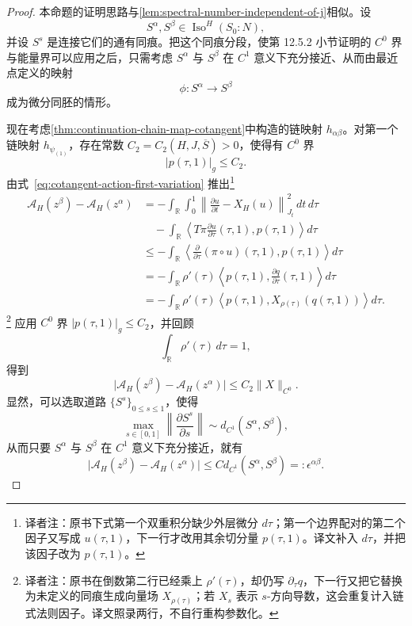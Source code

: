 \begin{proof}
本命题的证明思路与\cref{lem:spectral-number-independent-of-j}相似。设
\[
  S^\alpha,S^\beta\in\operatorname{Iso}^{H}(S_0:N),
\]
并设 $S^s$ 是连接它们的通有同痕。把这个同痕分段，使第 12.5.2 小节证明的 $C^0$ 界与能量界可以应用之后，只需考虑 $S^\alpha$ 与 $S^\beta$ 在 $C^1$ 意义下充分接近、从而由最近点定义的映射
\[
  \phi:S^\alpha\longrightarrow S^\beta
\]
成为微分同胚的情形。

现在考虑\cref{thm:continuation-chain-map-cotangent}中构造的链映射 $h_{\alpha\beta}$。对第一个链映射 $h_{\psi_{(1)}}$，存在常数 $C_2=C_2(H,J,\overline S)>0$，使得有 $C^0$ 界
\[
  \lvert p(\tau,1)\rvert_g\le C_2.
\]
由式~\eqref{eq:cotangent-action-first-variation} 推出\footnote{译者注：原书下式第一个双重积分缺少外层微分 $d\tau$；第一个边界配对的第二个因子又写成 $u(\tau,1)$，下一行才改用其余切分量 $p(\tau,1)$。译文补入 $d\tau$，并把该因子改为 $p(\tau,1)$。}
\[
\begin{split}
  \mathcal A_H(z^\beta)-\mathcal A_H(z^\alpha)
  &=-\int_{\mathbb R}\!\int_0^1
    \left\lVert\frac{\partial u}{\partial t}-X_H(u)\right\rVert_{J_t}^2
    \,dt\,d\tau\\
  &\quad-\int_{\mathbb R}
    \left\langle
      T\pi\frac{\partial u}{\partial\tau}(\tau,1),
      p(\tau,1)
    \right\rangle d\tau\\
  &\le-\int_{\mathbb R}
    \left\langle
      \frac{\partial}{\partial\tau}(\pi\circ u)(\tau,1),
      p(\tau,1)
    \right\rangle d\tau\\
  &=-\int_{\mathbb R}\rho'(\tau)
    \left\langle
      p(\tau,1),
      \frac{\partial q}{\partial\tau}(\tau,1)
    \right\rangle d\tau\\
  &=-\int_{\mathbb R}\rho'(\tau)
    \left\langle
      p(\tau,1),X_{\rho(\tau)}(q(\tau,1))
    \right\rangle d\tau.
\end{split}
\]
\footnote{译者注：原书在倒数第二行已经乘上 $\rho'(\tau)$，却仍写 $\partial_\tau q$，下一行又把它替换为未定义的同痕生成向量场 $X_{\rho(\tau)}$；若 $X_s$ 表示 $s$-方向导数，这会重复计入链式法则因子。译文照录两行，不自行重构参数化。}
应用 $C^0$ 界 $\lvert p(\tau,1)\rvert_g\le C_2$，并回顾
\[
  \int_{\mathbb R}\rho'(\tau)\,d\tau=1,
\]
得到
\[
  \bigl\lvert\mathcal A_H(z^\beta)-\mathcal A_H(z^\alpha)\bigr\rvert
  \le C_2\lVert X\rVert_{C^0}.
\]
显然，可以选取道路 $\{S^s\}_{0\le s\le1}$，使得
\[
  \max_{s\in[0,1]}
  \left\lVert\frac{\partial S^s}{\partial s}\right\rVert
  \sim d_{C^1}(S^\alpha,S^\beta),
\]
从而只要 $S^\alpha$ 与 $S^\beta$ 在 $C^1$ 意义下充分接近，就有
\[
  \bigl\lvert\mathcal A_H(z^\beta)-\mathcal A_H(z^\alpha)\bigr\rvert
  \le C d_{C^1}(S^\alpha,S^\beta)=:\epsilon^{\alpha\beta}.
\]


\end{proof}
